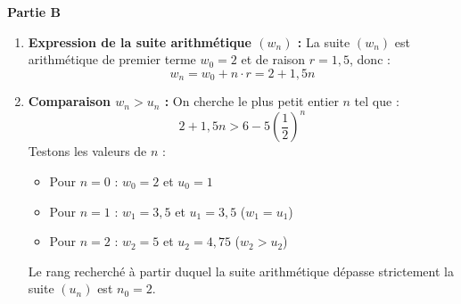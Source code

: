 \documentclass[11pt,a4paper]{article}
\newcommand{\partie}[1]{%
  \vspace{0.9em}%
  \noindent\textbf{#1}%
  \par\vspace{0.3em}%
}
\begin{document}
\partie{Partie B}

\begin{enumerate}
  \item \textbf{Expression de la suite arithmétique $(w_n)$ :}
  La suite $(w_n)$ est arithmétique de premier terme $w_0 = 2$ et de raison $r = 1,5$, donc :
  $$w_n = w_0 + n \cdot r = 2 + 1,5n$$
  \item \textbf{Comparaison $w_n > u_n$ :}
  On cherche le plus petit entier $n$ tel que :
  $$2 + 1,5n > 6 - 5 \left(\frac{1}{2}\right)^n$$
  Testons les valeurs de $n$ :
  \begin{itemize}
    \item Pour $n = 0$ : $w_0 = 2$ et $u_0 = 1$
    \item Pour $n = 1$ : $w_1 = 3,5$ et $u_1 = 3,5$ ($w_1 = u_1$)
    \item Pour $n = 2$ : $w_2 = 5$ et $u_2 = 4,75$ ($w_2 > u_2$)
  \end{itemize}
  Le rang recherché à partir duquel la suite arithmétique dépasse strictement la suite $(u_n)$ est $n_0 = 2$.
\end{enumerate}
\end{document}
